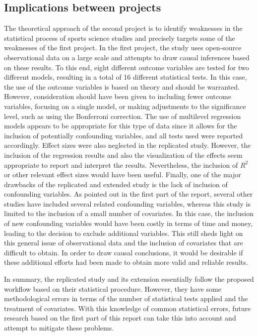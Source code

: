 \subsection{Implications between projects}

The theoretical approach of the second project is to identify weaknesses in the statistical process of sports science studies and precisely targets some of the weaknesses of the first project.
In the first project, the study uses open-source observational data on a large scale and attempts to draw causal inferences based on these results.
To this end, eight different outcome variables are tested for two different models, resulting in a total of 16 different statistical tests. In this case, the use of the outcome variables is based on theory and should be warranted. However, consideration should have been given to including fewer outcome variables, focusing on a single model, or making adjustments to the significance level, such as using the Bonferroni correction. 
The use of multilevel regression models appears to be appropriate for this type of data since it allows for the inclusion of potentially confounding variables, and all tests used were reported accordingly. 
Effect sizes were also neglected in the replicated study. However, the inclusion of the regression results and also the visualization of the effects seem appropriate to report and interpret the results. Nevertheless, the inclusion of $R^2$ or other relevant effect sizes would have been useful.
Finally, one of the major drawbacks of the replicated and extended study is the lack of inclusion of confounding variables. As pointed out in the first part of the report, several other studies have included several related confounding variables, whereas this study is limited to the inclusion of a small number of covariates. In this case, the inclusion of new confounding variables would have been costly in terms of time and money, leading to the decision to exclude additional variables. This still sheds light on this general issue of observational data and the inclusion of covariates that are difficult to obtain. In order to draw causal conclusions, it would be desirable if these additional efforts had been made to obtain more valid and reliable results.

In summary, the replicated study and its extension essentially follow the proposed workflow based on their statistical procedure. However, they have some methodological errors in terms of the number of statistical tests applied and the treatment of covariates. With this knowledge of common statistical errors, future research based on the first part of this report can take this into account and attempt to mitigate these problems.


